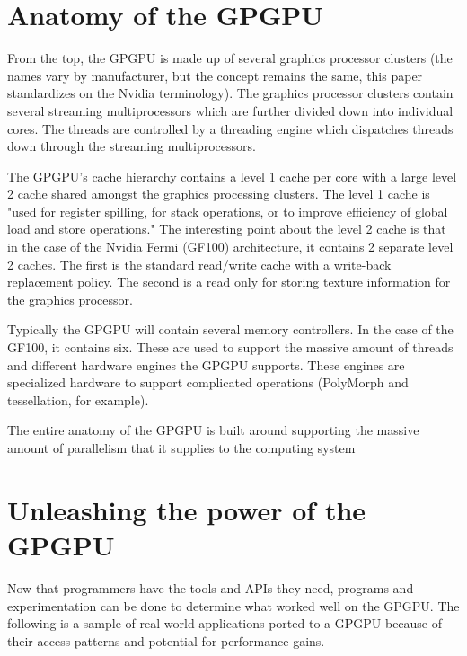 \section*{Anatomy of the GPGPU}

From the top, the GPGPU is made up of several graphics processor clusters (the names vary by manufacturer, but the concept remains the same, this paper standardizes on the Nvidia terminology). The graphics processor clusters contain several streaming multiprocessors which are further divided down into individual cores. The threads are controlled by a threading engine which dispatches threads down through the streaming multiprocessors. \cite{gpuarch}

The GPGPU's cache hierarchy contains a level 1 cache per core with a large level 2 cache shared amongst the graphics processing clusters. The level 1 cache is "used for register spilling, for stack operations, or to improve efficiency of global load and store operations." \cite{gpuarch} The interesting point about the level 2 cache is that in the case of the Nvidia Fermi (GF100) architecture, it contains 2 separate level 2 caches. The first is the standard read/write cache with a write-back replacement policy. The second is a read only for storing texture information for the graphics processor. \cite{gpuarch} 

Typically the GPGPU will contain several memory controllers. In the case of the GF100, it contains six. These are used to support the massive amount of threads and different hardware engines the GPGPU supports. These engines are specialized hardware to support complicated operations (PolyMorph and tessellation, for example). \cite{gpuarch} 

The entire anatomy of the GPGPU is built around supporting the massive amount of parallelism that it supplies to the computing system

\section*{Unleashing the power of the GPGPU}


Now that programmers have the tools and APIs they need, programs and experimentation can be done to determine what worked well on the GPGPU. The following is a sample of real world applications ported to a GPGPU because of their access patterns and potential for performance gains. 

